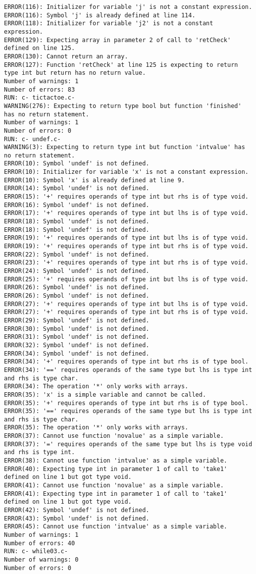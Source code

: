 \documentclass[12pt]{book}
\begin{document}
\begin{lstlisting}
ERROR(116): Initializer for variable 'j' is not a constant expression.
ERROR(116): Symbol 'j' is already defined at line 114.
ERROR(118): Initializer for variable 'j2' is not a constant expression.
ERROR(129): Expecting array in parameter 2 of call to 'retCheck' defined on line 125.
ERROR(130): Cannot return an array.
ERROR(127): Function 'retCheck' at line 125 is expecting to return type int but return has no return value.
Number of warnings: 1
Number of errors: 83
RUN: c- tictactoe.c-
WARNING(276): Expecting to return type bool but function 'finished' has no return statement.
Number of warnings: 1
Number of errors: 0
RUN: c- undef.c-
WARNING(3): Expecting to return type int but function 'intvalue' has no return statement.
ERROR(10): Symbol 'undef' is not defined.
ERROR(10): Initializer for variable 'x' is not a constant expression.
ERROR(10): Symbol 'x' is already defined at line 9.
ERROR(14): Symbol 'undef' is not defined.
ERROR(15): '+' requires operands of type int but rhs is of type void.
ERROR(16): Symbol 'undef' is not defined.
ERROR(17): '+' requires operands of type int but lhs is of type void.
ERROR(18): Symbol 'undef' is not defined.
ERROR(18): Symbol 'undef' is not defined.
ERROR(19): '+' requires operands of type int but lhs is of type void.
ERROR(19): '+' requires operands of type int but rhs is of type void.
ERROR(22): Symbol 'undef' is not defined.
ERROR(23): '+' requires operands of type int but rhs is of type void.
ERROR(24): Symbol 'undef' is not defined.
ERROR(25): '+' requires operands of type int but lhs is of type void.
ERROR(26): Symbol 'undef' is not defined.
ERROR(26): Symbol 'undef' is not defined.
ERROR(27): '+' requires operands of type int but lhs is of type void.
ERROR(27): '+' requires operands of type int but rhs is of type void.
ERROR(29): Symbol 'undef' is not defined.
ERROR(30): Symbol 'undef' is not defined.
ERROR(31): Symbol 'undef' is not defined.
ERROR(32): Symbol 'undef' is not defined.
ERROR(34): Symbol 'undef' is not defined.
ERROR(34): '+' requires operands of type int but rhs is of type bool.
ERROR(34): '==' requires operands of the same type but lhs is type int and rhs is type char.
ERROR(34): The operation '*' only works with arrays.
ERROR(35): 'x' is a simple variable and cannot be called.
ERROR(35): '+' requires operands of type int but rhs is of type bool.
ERROR(35): '==' requires operands of the same type but lhs is type int and rhs is type char.
ERROR(35): The operation '*' only works with arrays.
ERROR(37): Cannot use function 'novalue' as a simple variable.
ERROR(37): '=' requires operands of the same type but lhs is type void and rhs is type int.
ERROR(38): Cannot use function 'intvalue' as a simple variable.
ERROR(40): Expecting type int in parameter 1 of call to 'take1' defined on line 1 but got type void.
ERROR(41): Cannot use function 'novalue' as a simple variable.
ERROR(41): Expecting type int in parameter 1 of call to 'take1' defined on line 1 but got type void.
ERROR(42): Symbol 'undef' is not defined.
ERROR(43): Symbol 'undef' is not defined.
ERROR(45): Cannot use function 'intvalue' as a simple variable.
Number of warnings: 1
Number of errors: 40
RUN: c- while03.c-
Number of warnings: 0
Number of errors: 0


\end{lstlisting}
\end{document}
